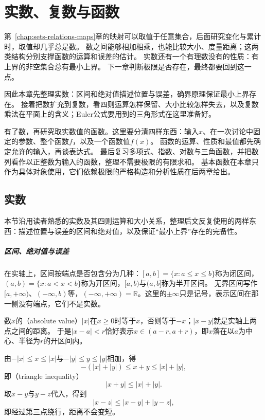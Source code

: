 \chapter{实数、复数与函数}
\label{chap:real-complex-functions}

第~\ref{chap:sets-relations-maps}章的映射可以取值于任意集合，后面研究变化与累计时，取值却几乎总是数。
数之间能够相加相乘，也能比较大小、度量距离；这两类结构分别支撑函数的运算和误差的估计。
实数还有一个有理数没有的性质：有上界的非空集合总有最小上界。
下一章判断极限是否存在，最终都要回到这一点。

因此本章先整理实数：区间和绝对值描述位置与误差，确界原理保证最小上界存在。
接着把数扩充到复数，看四则运算怎样保留、大小比较怎样失去，以及复数乘法在平面上的含义；Euler公式要用到的三角形式在这里准备好。

有了数，再研究取实数值的函数。这里要分清四样东西：输入$x$、在一次讨论中固定的参数、整个函数$f$，以及一个函数值$f(x)$。
函数的运算、性质和最值都先确定允许的输入，再谈表达式。
最后复习多项式、指数、对数与三角函数，并把数列看作以正整数为输入的函数，整理不需要极限的有限求和。
基本函数在本章只作为具体对象使用，它们依赖极限的严格构造和分析性质在后两章给出。

\section{实数}
\label{sec:ru-real-numbers}
\label{sec:real-valued-functions-bounds}

本节沿用读者熟悉的实数及其四则运算和大小关系，整理后文反复使用的两样东西：描述位置与误差的区间和绝对值，以及保证“最小上界”存在的完备性。

\paragraph{区间、绝对值与误差}
在实轴上，区间按端点是否包含分为几种：$[a,b]=\{x:a\leq x\leq b\}$称为闭区间，$(a,b)=\{x:a<x<b\}$称为开区间，$[a,b)$与$(a,b]$称为半开区间。
无界区间写作$[a,+\infty)$、$(-\infty,b)$等，$(-\infty,+\infty)=\mathbb R$。这里的$\pm\infty$只是记号，表示区间在那一侧没有端点，它们不是实数。

数$x$的（absolute value）$|x|$在$x\geq0$时等于$x$，否则等于$-x$；$|x-y|$就是实轴上两点之间的距离。
于是$|x-a|<r$恰好表示$x\in(a-r,a+r)$，即$x$落在以$a$为中心、半径为$r$的开区间内。

由$-|x|\leq x\leq|x|$与$-|y|\leq y\leq|y|$相加，得
\[
 -(|x|+|y|)\leq x+y\leq|x|+|y|,
\]
即（triangle inequality）
\begin{equation}
 |x+y|\leq|x|+|y|.
 \label{eq:ru-triangle-inequality}
\end{equation}
取$x-y$与$y-z$代入，得到
\[
 |x-z|\leq|x-y|+|y-z|,
\]
即经过第三点绕行，距离不会变短。

